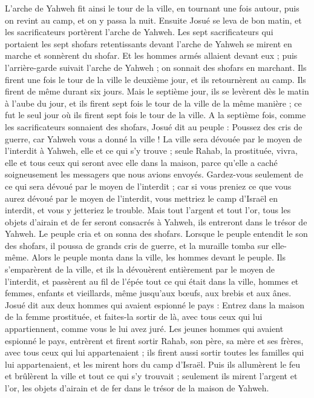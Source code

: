 \begin{multicols}{2}
L’arche de Yahweh fit ainsi le tour de la ville, en tournant une fois autour, puis on revint au camp, et on y passa la nuit.
Ensuite Josué se leva de bon matin, et les sacrificateurs portèrent l’arche de Yahweh.
Les sept sacrificateurs qui portaient les sept shofars retentissants devant l’arche de Yahweh se mirent en marche et sonnèrent du shofar. Et les hommes armés allaient devant eux ; puis l’arrière-garde suivait l’arche de Yahweh ; on sonnait des shofars en marchant.
Ils firent une fois le tour de la ville le deuxième jour, et ils retournèrent au camp. Ils firent de même durant six jours.
Mais le septième jour, ils se levèrent dès le matin à l’aube du jour, et ils firent sept fois le tour de la ville de la même manière ; ce fut le seul jour où ils firent sept fois le tour de la ville.
A la septième fois, comme les sacrificateurs sonnaient des shofars, Josué dit au peuple : Poussez des cris de guerre, car Yahweh vous a donné la ville !
La ville sera dévouée par le moyen de l'interdit à Yahweh, elle et ce qui s’y trouve ; seule Rahab, la prostituée\FTNT{}, vivra, elle et tous ceux qui seront avec elle dans la maison, parce qu’elle a caché soigneusement les messagers que nous avions envoyés.
Gardez-vous seulement de ce qui sera dévoué par le moyen de l'interdit ; car si vous preniez ce que vous aurez dévoué par le moyen de l'interdit, vous mettriez le camp d’Israël en interdit, et vous y jetteriez le trouble.
Mais tout l’argent et tout l’or, tous les objets d’airain et de fer seront consacrés à Yahweh, ils entreront dans le trésor de Yahweh.
Le peuple cria et on sonna des shofars. Lorsque le peuple entendit le son des shofars, il poussa de grands cris de guerre, et la muraille tomba sur elle-même. Alors le peuple monta dans la ville, les hommes devant le peuple. Ils s’emparèrent de la ville,
et ils la dévouèrent entièrement par le moyen de l'interdit, et passèrent au fil de l’épée tout ce qui était dans la ville, hommes et femmes, enfants et vieillards, même jusqu’aux bœufs, aux brebis et aux ânes.
Josué dit aux deux hommes qui avaient espionné le pays : Entrez dans la maison de la femme prostituée, et faites-la sortir de là, avec tous ceux qui lui appartiennent, comme vous le lui avez juré.
Les jeunes hommes qui avaient espionné le pays, entrèrent et firent sortir Rahab, son père, sa mère et ses frères, avec tous ceux qui lui appartenaient ; ils firent aussi sortir toutes les familles qui lui appartenaient, et les mirent hors du camp d’Israël.
Puis ils allumèrent le feu et brûlèrent la ville et tout ce qui s’y trouvait ; seulement ils mirent l’argent et l’or, les objets d’airain et de fer dans le trésor de la maison de Yahweh.

\end{multicols}
